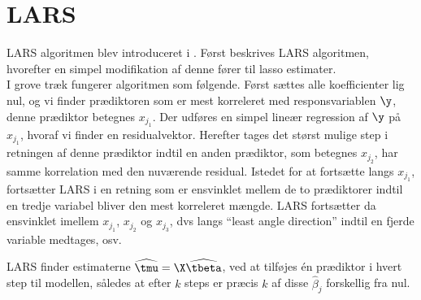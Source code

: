 \section{LARS}
LARS algoritmen blev introduceret i \citep{efron}. 
Først beskrives LARS algoritmen, hvorefter en simpel modifikation af denne fører til lasso estimater. \\[2mm]
%
I grove træk fungerer algoritmen som følgende. 
Først sættes alle koefficienter lig nul, og vi finder prædiktoren som er mest korreleret med responsvariablen \(\y\), denne prædiktor betegnes \(x_{j_1}\).
Der udføres en simpel lineær regression af \(\y\) på \(x_{j_1}\), hvoraf vi finder en residualvektor.
Herefter tages det størst mulige step i retningen af denne prædiktor indtil en anden prædiktor, som betegnes \(x_{j_2}\), har samme korrelation med den nuværende residual.
Istedet for at fortsætte langs \(x_{j_1}\), fortsætter LARS i en retning som er ensvinklet mellem de to prædiktorer indtil en tredje variabel bliver den mest korreleret mængde.
LARS fortsætter da ensvinklet imellem \(x_{j_1}\), \(x_{j_2}\) og \(x_{j_3}\), dvs langs ``least angle direction'' indtil en fjerde variable medtages, osv.

LARS finder estimaterne \(\widehat{\tmu} = \X \widehat{\tbeta}\), ved at tilføjes én prædiktor i hvert step til modellen, således at efter \(k\) steps er præcis \(k\) af disse \(\hat{\beta}_j\) forskellig fra nul.

